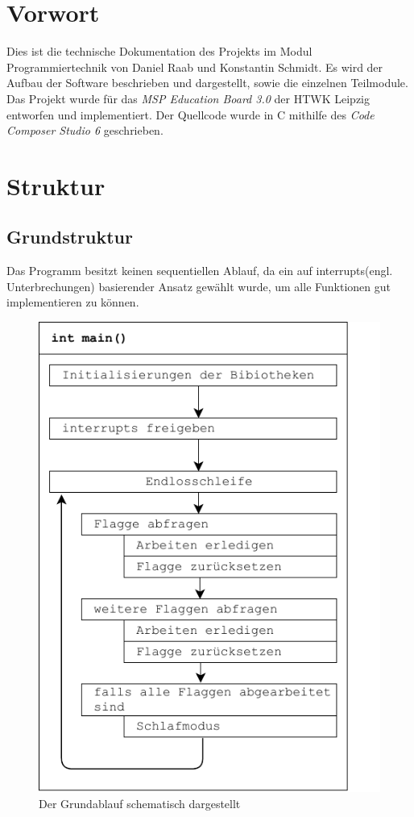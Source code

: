 \section{Vorwort}
Dies ist die technische Dokumentation des Projekts im Modul Programmiertechnik von Daniel Raab und Konstantin Schmidt. Es wird der Aufbau der Software beschrieben und dargestellt, sowie die einzelnen Teilmodule. Das Projekt wurde für das \emph{MSP Education Board 3.0} der HTWK Leipzig entworfen und implementiert. Der Quellcode wurde in C mithilfe des \emph{Code Composer Studio 6} geschrieben.
\section{Struktur}
\subsection{Grundstruktur}
\label{sub:grundstruktur}
Das Programm besitzt keinen sequentiellen Ablauf, da ein auf interrupts(engl. Unterbrechungen) basierender Ansatz gewählt wurde, um alle Funktionen gut implementieren zu können.
\begin{figure}[h]
    \centering
    \includegraphics{main_diagram.pdf}
    \caption{Der Grundablauf schematisch dargestellt}
    \label{img:grundablauf}
\end{figure}
